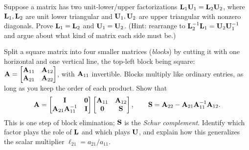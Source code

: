 \begin{exercise}
\label{ch09:ex-uniqueness}
Suppose a matrix has two unit-lower/upper factorizations
$\mathbf{L}_1\mathbf{U}_1=\mathbf{L}_2\mathbf{U}_2$, where $\mathbf{L}_1,\mathbf{L}_2$ are unit lower triangular
and $\mathbf{U}_1,\mathbf{U}_2$ are upper triangular with nonzero diagonals. Prove $\mathbf{L}_1=\mathbf{L}_2$
and $\mathbf{U}_1=\mathbf{U}_2$. (Hint: rearrange to $\mathbf{L}_2^{-1}\mathbf{L}_1=\mathbf{U}_2\mathbf{U}_1^{-1}$
and argue about what kind of matrix each side must be.)
\end{exercise}

\begin{exercise}
\label{ch09:ex-block}
Split a square matrix into four smaller matrices (\emph{blocks}) by cutting it with one
horizontal and one vertical line, the top-left block being square:
$\mathbf{A}=\begin{bmatrix} \mathbf{A}_{11} & \mathbf{A}_{12} \\ \mathbf{A}_{21} & \mathbf{A}_{22}
\end{bmatrix}$, with $\mathbf{A}_{11}$ invertible. Blocks multiply like ordinary entries, as
long as you keep the order of each product. Show that
\[
  \mathbf{A} = \begin{bmatrix} \mathbf{I} & \mathbf{0} \\ \mathbf{A}_{21}\mathbf{A}_{11}^{-1} & \mathbf{I} \end{bmatrix}
            \begin{bmatrix} \mathbf{A}_{11} & \mathbf{A}_{12} \\ \mathbf{0} & \mathbf{S} \end{bmatrix},
  \qquad \mathbf{S} = \mathbf{A}_{22} - \mathbf{A}_{21}\mathbf{A}_{11}^{-1}\mathbf{A}_{12}.
\]
This is one step of block elimination; $\mathbf{S}$ is the \emph{Schur complement}. Identify
which factor plays the role of $\mathbf{L}$ and which plays $\mathbf{U}$, and explain how this
generalizes the scalar multiplier $\ell_{21}=a_{21}/a_{11}$.
\end{exercise}

